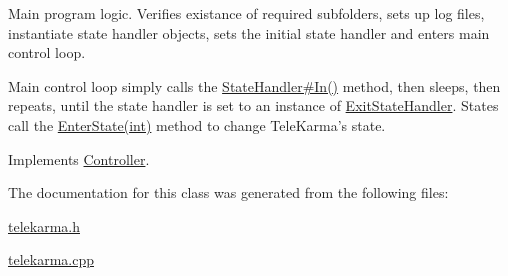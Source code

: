Main program logic. Verifies existance of required subfolders, sets up log files, instantiate state handler objects, sets the initial state handler and enters main control loop. 

Main control loop simply calls the \hyperlink{}{StateHandler\#In()} method, then sleeps, then repeats, until the state handler is set to an instance of \hyperlink{}{ExitStateHandler}. States call the \hyperlink{}{EnterState(int)} method to change TeleKarma's state.  

Implements \hyperlink{classController_efeb521047c5b5d1c3f97290d015cacf}{Controller}.

The documentation for this class was generated from the following files:\begin{CompactItemize}
\item 
\hyperlink{telekarma_8h}{telekarma.h}\item 
\hyperlink{telekarma_8cpp}{telekarma.cpp}\end{CompactItemize}
